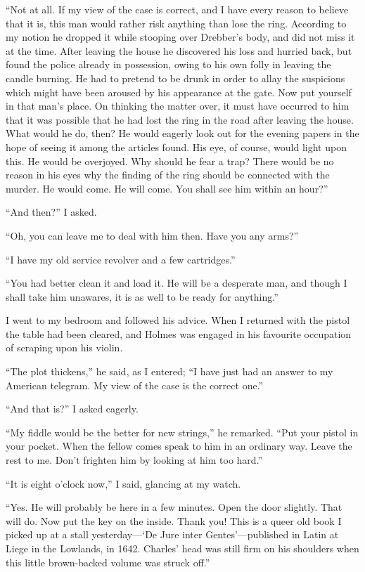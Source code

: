 \documentclass[12pt]{book}
\begin{document}
“Not at all. If my view of the case is correct, and I have every reason to believe that it is, this man would rather risk anything than lose the ring. According to my notion he dropped it while stooping over Drebber’s body, and did not miss it at the time. After leaving the house he discovered his loss and hurried back, but found the police already in possession, owing to his own folly in leaving the candle burning. He had to pretend to be drunk in order to allay the suspicions which might have been aroused by his appearance at the gate. Now put yourself in that man’s place. On thinking the matter over, it must have occurred to him that it was possible that he had lost the ring in the road after leaving the house. What would he do, then? He would eagerly look out for the evening papers in the hope of seeing it among the articles found. His eye, of course, would light upon this. He would be overjoyed. Why should he fear a trap? There would be no reason in his eyes why the finding of the ring should be connected with the murder. He would come. He will come. You shall see him within an hour?” 

“And then?” I asked. 

“Oh, you can leave me to deal with him then. Have you any arms?” 

“I have my old service revolver and a few cartridges.” 

“You had better clean it and load it. He will be a desperate man, and though I shall take him unawares, it is as well to be ready for anything.” 

I went to my bedroom and followed his advice. When I returned with the pistol the table had been cleared, and Holmes was engaged in his favourite occupation of scraping upon his violin. 

“The plot thickens,” he said, as I entered; “I have just had an answer to my American telegram. My view of the case is the correct one.” 

“And that is?” I asked eagerly. 

“My fiddle would be the better for new strings,” he remarked. “Put your pistol in your pocket. When the fellow comes speak to him in an ordinary way. Leave the rest to me. Don’t frighten him by looking at him too hard.” 

“It is eight o’clock now,” I said, glancing at my watch. 

“Yes. He will probably be here in a few minutes. Open the door slightly. That will do. Now put the key on the inside. Thank you! This is a queer old book I picked up at a stall yesterday—‘De Jure inter Gentes’—published in Latin at Liege in the Lowlands, in 1642. Charles’ head was still firm on his shoulders when this little brown-backed volume was struck off.” 
\end{document}

